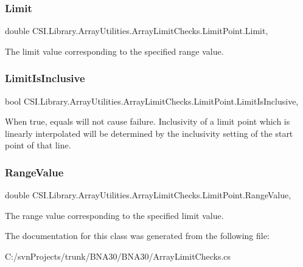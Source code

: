 \subsubsection{\texorpdfstring{Limit}{Limit}}
{\footnotesize\ttfamily double C\+S\+I.\+Library.\+Array\+Utilities.\+Array\+Limit\+Checks.\+Limit\+Point.\+Limit\hspace{0.3cm}{\ttfamily [get]}, {\ttfamily [set]}}



The limit value corresponding to the specified range value. 

\mbox{\label{class_c_s_i_1_1_library_1_1_array_utilities_1_1_array_limit_checks_1_1_limit_point_aeda976e335b30a4488970cb159f55d8d}} 
\subsubsection{\texorpdfstring{LimitIsInclusive}{LimitIsInclusive}}
{\footnotesize\ttfamily bool C\+S\+I.\+Library.\+Array\+Utilities.\+Array\+Limit\+Checks.\+Limit\+Point.\+Limit\+Is\+Inclusive\hspace{0.3cm}{\ttfamily [get]}, {\ttfamily [set]}}



When true, equals will not cause failure. Inclusivity of a limit point which is linearly interpolated will be determined by the inclusivity setting of the start point of that line. 

\mbox{\label{class_c_s_i_1_1_library_1_1_array_utilities_1_1_array_limit_checks_1_1_limit_point_a5a8d729144fd21c67fed5f1f842588c0}} 
\subsubsection{\texorpdfstring{RangeValue}{RangeValue}}
{\footnotesize\ttfamily double C\+S\+I.\+Library.\+Array\+Utilities.\+Array\+Limit\+Checks.\+Limit\+Point.\+Range\+Value\hspace{0.3cm}{\ttfamily [get]}, {\ttfamily [set]}}



The range value corresponding to the specified limit value. 



The documentation for this class was generated from the following file\+:\begin{DoxyCompactItemize}
\item 
C\+:/svn\+Projects/trunk/\+B\+N\+A30/\+B\+N\+A30/Array\+Limit\+Checks.\+cs\end{DoxyCompactItemize}

